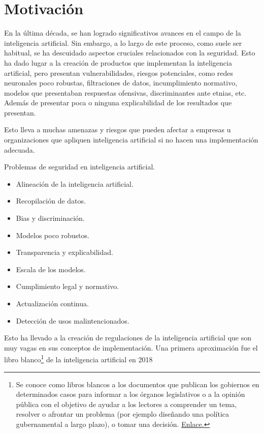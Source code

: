 \section{Motivación}

En la última década, se han logrado significativos avances en el campo de la inteligencia artificial. Sin embargo, a lo largo de este proceso, como suele ser habitual, se ha descuidado  aspectos cruciales relacionados con la seguridad. Esto ha dado lugar a la creación de productos que implementan la inteligencia artificial, pero presentan vulnerabilidades, riesgos potenciales, como redes neuronales poco robustas, filtraciones de datos, incumplimiento normativo, modelos que presentaban respuestas ofensivas, discriminantes ante etnias, etc. Además de presentar poca o ninguna explicabilidad de los resultados que presentan.

Esto lleva a muchas amenazas y riesgos que pueden afectar a empresas u organizaciones que apliquen inteligencia artificial si no hacen una implementación adecuada.

Problemas de seguridad en inteligencia artificial.

\begin{itemize}
    \item Alineación de la inteligencia artificial.
    \item Recopilación de datos.
    \item Bias y discriminación.
    \item Modelos poco robustos.
    \item Transparencia y explicabilidad.
    \item Escala de los modelos.
    \item Cumplimiento legal y normativo.
    \item Actualización continua.
    \item Detección de usos malintencionados.
\end{itemize}

Esto ha llevado a la creación de regulaciones de la inteligencia artificial que son muy vagas en sus conceptos de implementación.
Una primera aproximación fue el libro blanco\footnote{Se conoce como libros blancos a los documentos que publican los gobiernos en determinados casos para informar a los órganos legislativos o a la opinión pública con el objetivo de ayudar a los lectores a comprender un tema, resolver o afrontar un problema (por ejemplo diseñando una política gubernamental a largo plazo), o tomar una decisión. \href{https://es.wikipedia.org/wiki/Libro_blanco}{Enlace.}} de la inteligencia artificial en 2018 \cite{whitebook2020AI}

